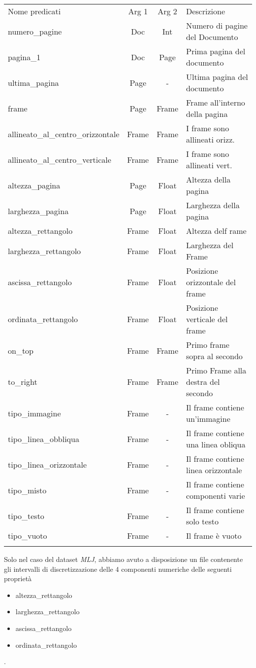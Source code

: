 \begin{table}[htbp]
\centering
\label{tab:predicati}
\footnotesize\begin{tabular}{lccl}
\toprule
\addlinespace
Nome predicati & Arg 1 & Arg 2 & Descrizione \\
\addlinespace
\midrule
\addlinespace
numero\_pagine & Doc & Int & Numero di pagine del Documento \\ 
pagina\_1 & Doc & Page & Prima pagina del documento \\ 
ultima\_pagina & Page & - & Ultima pagina del documento\\
frame & Page & Frame & Frame all'interno della pagina\\
allineato\_al\_centro\_orizzontale & Frame & Frame & I frame sono allineati orizz.\\
allineato\_al\_centro\_verticale & Frame & Frame & I frame sono allineati vert.\\
altezza\_pagina & Page & Float & Altezza della pagina\\
larghezza\_pagina & Page & Float & Larghezza della pagina\\
altezza\_rettangolo & Frame & Float & Altezza delf rame\\
larghezza\_rettangolo & Frame & Float & Larghezza del Frame\\
ascissa\_rettangolo & Frame & Float & Posizione orizzontale del frame\\
ordinata\_rettangolo & Frame & Float & Posizione verticale del frame\\
on\_top & Frame & Frame & Primo frame sopra al secondo\\
to\_right & Frame & Frame & Primo Frame alla destra del secondo\\
tipo\_immagine & Frame & - & Il frame contiene un'immagine\\
tipo\_linea\_obbliqua & Frame & - & Il frame contiene una linea obliqua\\
tipo\_linea\_orizzontale & Frame & - & Il frame contiene linea orizzontale\\
tipo\_misto & Frame & - & Il frame contiene componenti varie\\
tipo\_testo & Frame & - & Il frame contiene solo testo\\
tipo\_vuoto & Frame & - & Il frame è vuoto\\
\addlinespace
\bottomrule 
\end{tabular}
\end{table}

Solo nel caso del dataset \emph{MLJ}, abbiamo avuto a disposizione un file contenente gli intervalli di discretizzazione delle 4 componenti numeriche delle seguenti proprietà
\begin{itemize}
\item altezza\_rettangolo
\item larghezza\_rettangolo
\item ascissa\_rettangolo
\item ordinata\_rettangolo
\end{itemize}
.

